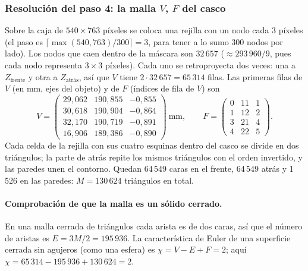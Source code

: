 \subsubsection{Resolución del paso 4: la malla $V$, $F$ del casco}\label{sec:casco-malla}

Sobre la caja de $540\times763$ píxeles se coloca una rejilla con un nodo cada $3$ píxeles (el paso es $\lceil\max(540,763)/300\rceil=3$, para
tener a lo sumo 300 nodos por lado). Los nodos que caen dentro de la máscara son $32\,657$ ($\approx293\,960/9$, pues cada nodo representa
$3\times3$ píxeles). Cada uno se retroproyecta dos veces: una a $Z_{\text{frente}}$ y otra a $Z_{\text{atrás}}$, así que
$V$ tiene $2\cdot32\,657=65\,314$ filas. Las primeras filas de $V$ (en mm, ejes del objeto) y de $F$ (índices de fila de $V$) son
\begin{equation}
V=\begin{pmatrix} 29{,}062 & 190{,}855 & -0{,}855 \\ 30{,}618 & 190{,}904 & -0{,}864 \\ 32{,}170 & 190{,}719 & -0{,}891 \\ 16{,}906 & 189{,}386 & -0{,}890 \end{pmatrix}\ \text{mm},\qquad F=\begin{pmatrix} 0 & 11 & 1 \\ 1 & 12 & 2 \\ 3 & 21 & 4 \\ 4 & 22 & 5 \end{pmatrix} .
\end{equation}
Cada celda de la rejilla con sus cuatro esquinas dentro del casco se divide en dos triángulos; la parte de atrás repite los mismos
triángulos con el orden invertido, y las paredes unen el contorno. Quedan 64\,549 caras en el frente, 64\,549 atrás y 1\,526 en las
paredes: $M=130\,624$ triángulos en total.

\paragraph{Comprobación de que la malla es un sólido cerrado.} En una malla cerrada de triángulos cada arista es de dos caras, así que el número de aristas es
$E=3M/2=195\,936$. La característica de Euler de una superficie cerrada sin agujeros (como una esfera) es $\chi=V-E+F=2$; aquí
$\chi=65\,314-195\,936+130\,624=2$.

